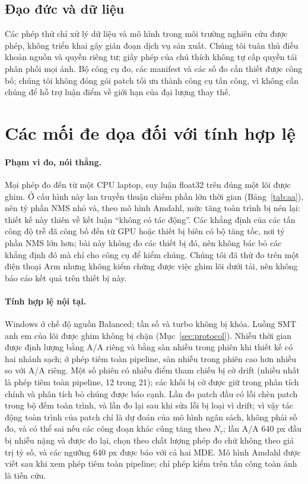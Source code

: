 \documentclass[12pt,a4paper]{article}
\newcommand{\Ntau}{N_{\tau}}
\begin{document}
\subsection{Đạo đức và dữ liệu}
Các phép thử chỉ xử lý dữ liệu và mô hình trong môi trường nghiên cứu được phép, không triển khai gây gián đoạn dịch vụ sản xuất. Chúng tôi tuân thủ điều khoản nguồn và quyền riêng tư; giấy phép của chú thích không tự cấp quyền tái phân phối mọi ảnh. Bộ công cụ đo, các manifest và các số đo cần thiết được công bố; chúng tôi không đóng gói patch tối ưu thành công cụ tấn công, vì không cần chúng để hỗ trợ luận điểm về giới hạn của đại lượng thay thế.

\section{Các mối đe dọa đối với tính hợp lệ}
\label{sec:threats}
\paragraph{Phạm vi đo, nói thẳng.}
Mọi phép đo đến từ một CPU laptop, suy luận float32 trên đúng một lõi được ghim. Ở cấu hình này lan truyền thuận chiếm phần lớn thời gian (Bảng~\ref{tab:aa}), nên tỷ phần NMS nhỏ và, theo mô hình Amdahl, mức tăng toàn trình bị nén lại: thiết kế này thiên về kết luận ``không có tác động''. Các khẳng định của các tấn công độ trễ đã công bố đến từ GPU hoặc thiết bị biên có bộ tăng tốc, nơi tỷ phần NMS lớn hơn; bài này không đo các thiết bị đó, nên không bác bỏ các khẳng định đó mà chỉ cho công cụ để kiểm chúng. Chúng tôi đã thử đo trên một điện thoại Arm nhưng không kiểm chứng được việc ghim lõi dưới tải, nên không báo cáo kết quả trên thiết bị này.
\paragraph{Tính hợp lệ nội tại.}
Windows ở chế độ nguồn Balanced; tần số và turbo không bị khóa. Luồng SMT anh em của lõi được ghim không bị chặn (Mục~\ref{sec:protocol}). Nhiễu thời gian được định lượng bằng A/A riêng và bằng sàn nhiễu trong phiên khi thiết kế có hai nhánh sạch; ở phép tiêm toàn pipeline, sàn nhiễu trong phiên cao hơn nhiều so với A/A riêng. Một số phiên có nhiều điểm tham chiếu bị cờ drift (nhiều nhất là phép tiêm toàn pipeline, 12 trong 21); các khối bị cờ được giữ trong phân tích chính và phân tích bỏ chúng được báo cạnh. Lần đo patch đầu có lỗi chèn patch trong bộ đếm toàn trình, và lần đo lại sau khi sửa lỗi bị loại vì drift; vì vậy tác động toàn trình của patch chỉ là dự đoán của mô hình ngân sách, không phải số đo, và có thể sai nếu các công đoạn khác cũng tăng theo $\Ntau$; lần A/A 640 px đầu bị nhiễu nặng và được đo lại, chọn theo chất lượng phép đo chứ không theo giá trị tỷ số, và các ngưỡng 640 px được báo với cả hai MDE. Mô hình Amdahl được viết sau khi xem phép tiêm toàn pipeline; chỉ phép kiểm trên tấn công toàn ảnh là tiến cứu.
\end{document}
